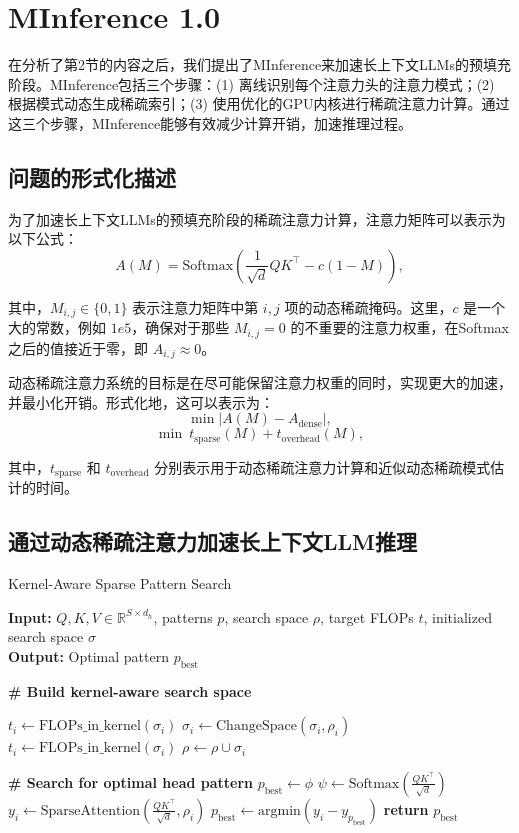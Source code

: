 \documentclass[twocolumn, 10pt]{article} %
\theoremstyle{remark}
\begin{document}
\section{MInference 1.0}
        在分析了第2节的内容之后，我们提出了MInference来加速长上下文LLMs的预填充阶段。MInference包括三个步骤：(1) 离线识别每个注意力头的注意力模式；(2) 根据模式动态生成稀疏索引；(3) 使用优化的GPU内核进行稀疏注意力计算。通过这三个步骤，MInference能够有效减少计算开销，加速推理过程。

\subsection{问题的形式化描述}

为了加速长上下文LLMs的预填充阶段的稀疏注意力计算，注意力矩阵可以表示为以下公式：
\[
A(M) = \text{Softmax}\left(\frac{1}{\sqrt{d}} QK^\top - c(1 - M)\right),
\]

其中，$M_{i,j} \in \{0, 1\}$ 表示注意力矩阵中第 $i, j$ 项的动态稀疏掩码。这里，$c$ 是一个大的常数，例如 $1e5$，确保对于那些 $M_{i,j} = 0$ 的不重要的注意力权重，在Softmax之后的值接近于零，即 $A_{i,j} \approx 0$。

动态稀疏注意力系统的目标是在尽可能保留注意力权重的同时，实现更大的加速，并最小化开销。形式化地，这可以表示为：
\[
\min \left|A(M) - A_{\text{dense}}\right|,
\]
\[
\min \ t_{\text{sparse}}(M) + t_{\text{overhead}}(M),
\]

其中，$t_{\text{sparse}}$ 和 $t_{\text{overhead}}$ 分别表示用于动态稀疏注意力计算和近似动态稀疏模式估计的时间。



\subsection{通过动态稀疏注意力加速长上下文LLM推理}
\begin{algorithm}[H]
\caption{Kernel-Aware Sparse Pattern Search}
\textbf{Input:} $Q, K, V \in \mathbb{R}^{S \times d_h}$, patterns $p$, search space $\rho$, target FLOPs $t$, initialized search space $\sigma$ \\
\textbf{Output:} Optimal pattern $p_{\text{best}}$

\textbf{\# Build kernel-aware search space}
\begin{algorithmic}[1]
    \STATE $t_i \gets \text{FLOPs\_in\_kernel}(\sigma_i)$
        \STATE $\sigma_i \gets \text{ChangeSpace}(\sigma_i, \rho_i)$
        \STATE $t_i \gets \text{FLOPs\_in\_kernel}(\sigma_i)$
    \ENDWHILE
    \STATE $\rho \gets \rho \cup \sigma_i$
\ENDFOR

\textbf{\# Search for optimal head pattern}
\STATE $p_{\text{best}} \gets \phi$
\STATE $\psi \gets \text{Softmax}\left(\frac{Q K^\top}{\sqrt{d}}\right)$
    \STATE $y_i \gets \text{SparseAttention}\left(\frac{Q K^\top}{\sqrt{d}}, \rho_i\right)$
    \STATE $p_{\text{best}} \gets \text{argmin}(y_i - y_{p_{\text{best}}})$
\ENDFOR
\STATE \textbf{return} $p_{\text{best}}$
\end{algorithmic}
\end{algorithm}
\end{document}
